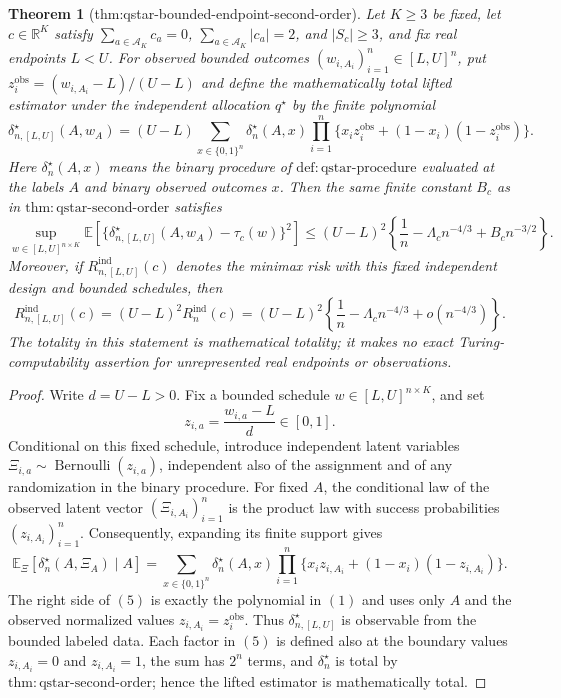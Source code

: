\documentclass{article}
\newtheorem{theorem}{Theorem}
\begin{document}
{\begin{theorem}[thm:qstar-bounded-endpoint-second-order]\label{thm:qstar-bounded-endpoint-second-order}
Let \(K\ge3\) be fixed, let \(c\in\mathbb R^K\) satisfy \(\sum_{a\in\mathcal A_K}c_a=0\), \(\sum_{a\in\mathcal A_K}|c_a|=2\), and \(|S_c|\ge3\), and fix real endpoints \(L<U\). For observed bounded outcomes \((w_{i,A_i})_{i=1}^n\in[L,U]^n\), put \(z_i^{\mathrm{obs}}=(w_{i,A_i}-L)/(U-L)\) and define the mathematically total lifted estimator under the independent allocation \(q^\star\) by the finite polynomial
\[
\delta_{n,[L,U]}^\star(A,w_A)
=(U-L)\sum_{x\in\{0,1\}^n}
 \delta_n^\star(A,x)
 \prod_{i=1}^n
 \{x_i z_i^{\mathrm{obs}}+(1-x_i)(1-z_i^{\mathrm{obs}})\}.
\tag{1}
\]
Here \(\delta_n^\star(A,x)\) means the binary procedure of \(\mathrm{def:qstar\text{-}procedure}\) evaluated at the labels \(A\) and binary observed outcomes \(x\). Then the same finite constant \(B_c\) as in \(\mathrm{thm:qstar\text{-}second\text{-}order}\) satisfies
\[
\sup_{w\in[L,U]^{n\times K}}
\mathbb E\!\left[
 \{\delta_{n,[L,U]}^\star(A,w_A)-\tau_c(w)\}^2
\right]
\le (U-L)^2\left\{
 \frac1n-\Lambda_cn^{-4/3}+B_cn^{-3/2}
\right\}.
\tag{2}
\]
Moreover, if \(R_{n,[L,U]}^{\mathrm{ind}}(c)\) denotes the minimax risk with this fixed independent design and bounded schedules, then
\[
R_{n,[L,U]}^{\mathrm{ind}}(c)
=(U-L)^2R_n^{\mathrm{ind}}(c)
=(U-L)^2\left\{
 \frac1n-\Lambda_cn^{-4/3}+o(n^{-4/3})
\right\}.
\tag{3}
\]
The totality in this statement is mathematical totality; it makes no exact Turing-computability assertion for unrepresented real endpoints or observations.
\end{theorem}
\begin{proof}
Write \(d=U-L>0\). Fix a bounded schedule \(w\in[L,U]^{n\times K}\), and set
\[
z_{i,a}=\frac{w_{i,a}-L}{d}\in[0,1].
\tag{4}
\]
Conditional on this fixed schedule, introduce independent latent variables \(\Xi_{i,a}\sim\operatorname{Bernoulli}(z_{i,a})\), independent also of the assignment and of any randomization in the binary procedure. For fixed \(A\), the conditional law of the observed latent vector \((\Xi_{i,A_i})_{i=1}^n\) is the product law with success probabilities \((z_{i,A_i})_{i=1}^n\). Consequently, expanding its finite support gives
\[
\mathbb E_{\Xi}\!\left[\delta_n^\star(A,\Xi_A)\mid A\right]
=\sum_{x\in\{0,1\}^n}\delta_n^\star(A,x)
 \prod_{i=1}^n\{x_i z_{i,A_i}+(1-x_i)(1-z_{i,A_i})\}.
\tag{5}
\]
The right side of \((5)\) is exactly the polynomial in \((1)\) and uses only \(A\) and the observed normalized values \(z_{i,A_i}=z_i^{\mathrm{obs}}\). Thus \(\delta_{n,[L,U]}^\star\) is observable from the bounded labeled data. Each factor in \((5)\) is defined also at the boundary values \(z_{i,A_i}=0\) and \(z_{i,A_i}=1\), the sum has \(2^n\) terms, and \(\delta_n^\star\) is total by \(\mathrm{thm:qstar\text{-}second\text{-}order}\); hence the lifted estimator is mathematically total.


\end{proof}}
\end{document}
